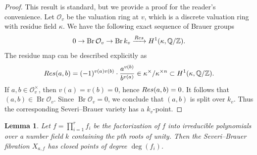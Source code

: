 \documentclass[11pt]{amsart}
\theoremstyle{plain}
\newtheorem{lemma}[thm]{Lemma}
\theoremstyle{definition}
\newcommand{\Res}{{\rm Res}}
\newcommand{\Q}{{\mathbb Q}}
\newcommand{\Z}{{\mathbb Z}}
\DeclareMathOperator{\Br}{Br}
\begin{document}
\begin{proof}
This result is standard, but we provide a proof for the reader’s convenience. Let $\mathcal{O}_v$ be the valuation ring at $v$, which is a discrete valuation ring with residue field $\kappa$. 
We have the following exact sequence of Brauer groups
\[
0 \to \Br\mathcal{O}_v \to \Br k_v 
\xrightarrow{\Res} H^1(\kappa,\Q/\Z).
\]
The residue map can be described explicitly as
$$ \Res(a,b) = 
(-1)^{v(a)v(b)} \cdot \frac{a^{v(b)}}{b^{v(a)}} 
\in \kappa^\times / \kappa^{\times n} 
\subset H^1(\kappa,\Q/\Z).$$
If $a,b \in \mathcal{O}_v^\times$, then $v(a)=v(b)=0$, hence $\Res(a,b)=0$. 
It follows that $(a,b) \in \Br \mathcal{O}_v$. 
Since $\Br \mathcal{O}_v=0$\cite[Corollary 6.9.3.]{poonen}, we conclude that $(a,b)$ is split over $k_v$. Thus the corresponding Severi--Brauer variety has a $k_v$-point.
\end{proof}

\begin{lemma}\label{closed point of certain degree}
Let $f = \prod_{i=1}^r f_i$ be the factorization of $f$ into irreducible polynomials over a number field $k$ containing the $p$th roots of unity. 
Then the Severi--Brauer fibration $X_{a,f}$ has closed points of degree $\deg(f_i)$.
\end{lemma}
\end{document}
